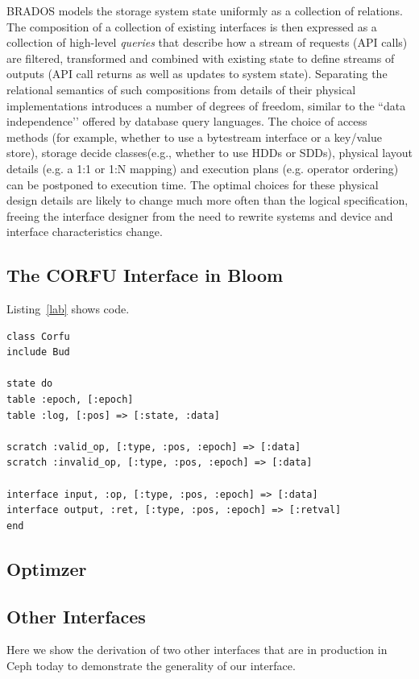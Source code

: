 \documentclass[10pt,twocolumn]{article}
\begin{document}
BRADOS models the storage system state uniformly as a collection of relations.
The composition of a collection of existing interfaces is then expressed as a
collection of high-level \emph{queries} that describe how a stream of requests
(API calls) are filtered, transformed and combined with existing state to
define streams of outputs (API call returns as well as updates to system
state).  Separating the relational semantics of such compositions from details
of their physical implementations introduces a number of degrees of freedom,
similar to the ``data independence’’ offered by database query languages.  The
choice of access methods (for example, whether to use a bytestream interface or
a key/value store), storage decide classes(e.g., whether to use HDDs or SDDs),
physical layout details (e.g. a 1:1 or 1:N mapping) and execution plans (e.g.
operator ordering) can be postponed to execution time.  The optimal choices for
these physical design details are likely to change much more often than the
logical specification, freeing the interface designer from the need to rewrite
systems and device and interface characteristics change.  

\subsection{The CORFU Interface in Bloom}

Listing~\ref{lab} shows code.

\begin{lstlisting}[caption={Hello}, label=lab]
class Corfu
include Bud

state do
table :epoch, [:epoch]
table :log, [:pos] => [:state, :data]

scratch :valid_op, [:type, :pos, :epoch] => [:data]
scratch :invalid_op, [:type, :pos, :epoch] => [:data]

interface input, :op, [:type, :pos, :epoch] => [:data]
interface output, :ret, [:type, :pos, :epoch] => [:retval]
end
\end{lstlisting}

\subsection{Optimzer}

\subsection{Other Interfaces}

Here we show the derivation of two other interfaces that are in production in
Ceph today to demonstrate the generality of our interface.
\end{document}
